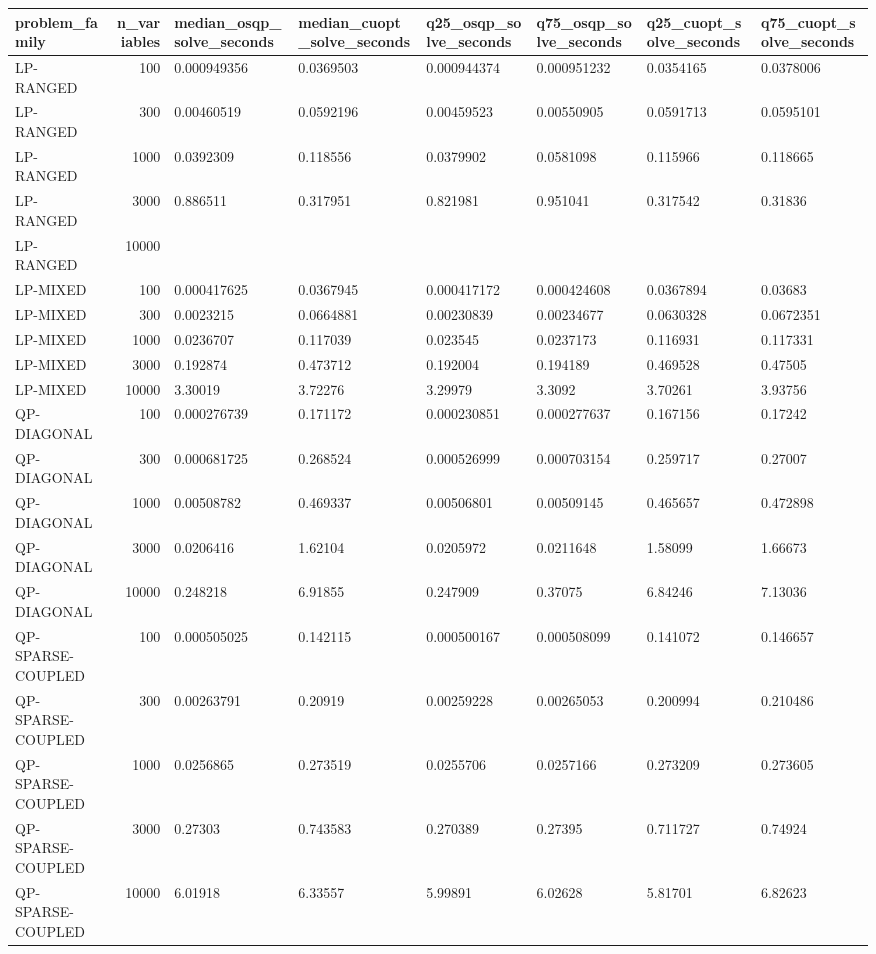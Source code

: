 \begin{table}
\label{tab:cold-solve-time}
\begin{tabular}{lrllllll}
\toprule
problem\_family & n\_variables & median\_osqp\_solve\_seconds & median\_cuopt\_solve\_seconds & q25\_osqp\_solve\_seconds & q75\_osqp\_solve\_seconds & q25\_cuopt\_solve\_seconds & q75\_cuopt\_solve\_seconds \\
\midrule
LP-RANGED & 100 & 0.000949356 & 0.0369503 & 0.000944374 & 0.000951232 & 0.0354165 & 0.0378006 \\
LP-RANGED & 300 & 0.00460519 & 0.0592196 & 0.00459523 & 0.00550905 & 0.0591713 & 0.0595101 \\
LP-RANGED & 1000 & 0.0392309 & 0.118556 & 0.0379902 & 0.0581098 & 0.115966 & 0.118665 \\
LP-RANGED & 3000 & 0.886511 & 0.317951 & 0.821981 & 0.951041 & 0.317542 & 0.31836 \\
LP-RANGED & 10000 &  &  &  &  &  &  \\
LP-MIXED & 100 & 0.000417625 & 0.0367945 & 0.000417172 & 0.000424608 & 0.0367894 & 0.03683 \\
LP-MIXED & 300 & 0.0023215 & 0.0664881 & 0.00230839 & 0.00234677 & 0.0630328 & 0.0672351 \\
LP-MIXED & 1000 & 0.0236707 & 0.117039 & 0.023545 & 0.0237173 & 0.116931 & 0.117331 \\
LP-MIXED & 3000 & 0.192874 & 0.473712 & 0.192004 & 0.194189 & 0.469528 & 0.47505 \\
LP-MIXED & 10000 & 3.30019 & 3.72276 & 3.29979 & 3.3092 & 3.70261 & 3.93756 \\
QP-DIAGONAL & 100 & 0.000276739 & 0.171172 & 0.000230851 & 0.000277637 & 0.167156 & 0.17242 \\
QP-DIAGONAL & 300 & 0.000681725 & 0.268524 & 0.000526999 & 0.000703154 & 0.259717 & 0.27007 \\
QP-DIAGONAL & 1000 & 0.00508782 & 0.469337 & 0.00506801 & 0.00509145 & 0.465657 & 0.472898 \\
QP-DIAGONAL & 3000 & 0.0206416 & 1.62104 & 0.0205972 & 0.0211648 & 1.58099 & 1.66673 \\
QP-DIAGONAL & 10000 & 0.248218 & 6.91855 & 0.247909 & 0.37075 & 6.84246 & 7.13036 \\
QP-SPARSE-COUPLED & 100 & 0.000505025 & 0.142115 & 0.000500167 & 0.000508099 & 0.141072 & 0.146657 \\
QP-SPARSE-COUPLED & 300 & 0.00263791 & 0.20919 & 0.00259228 & 0.00265053 & 0.200994 & 0.210486 \\
QP-SPARSE-COUPLED & 1000 & 0.0256865 & 0.273519 & 0.0255706 & 0.0257166 & 0.273209 & 0.273605 \\
QP-SPARSE-COUPLED & 3000 & 0.27303 & 0.743583 & 0.270389 & 0.27395 & 0.711727 & 0.74924 \\
QP-SPARSE-COUPLED & 10000 & 6.01918 & 6.33557 & 5.99891 & 6.02628 & 5.81701 & 6.82623 \\
\bottomrule
\end{tabular}
\end{table}
